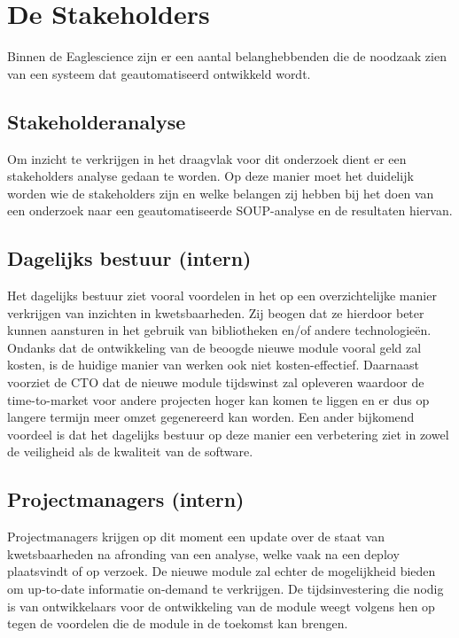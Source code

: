 \section{De Stakeholders}\label{sec:de-stakeholders}
Binnen de Eaglescience zijn er een aantal belanghebbenden die de noodzaak zien van een systeem dat geautomatiseerd ontwikkeld wordt.

\subsection{Stakeholderanalyse}\label{subsec:stakeholdersanalyse1}
Om inzicht te verkrijgen in het draagvlak voor dit onderzoek dient er een stakeholders analyse gedaan te worden. Op deze manier moet het duidelijk worden wie de stakeholders zijn en welke belangen zij hebben bij het doen van een onderzoek naar een geautomatiseerde SOUP-analyse en de resultaten hiervan.

\subsection{Dagelijks bestuur (intern)}\label{subsec:dagelijks-bestuur-(intern)1}
Het dagelijks bestuur ziet vooral voordelen in het op een overzichtelijke manier verkrijgen van inzichten in kwetsbaarheden. Zij beogen dat ze hierdoor beter kunnen aansturen in het gebruik van bibliotheken en/of andere technologieën. Ondanks dat de ontwikkeling van de beoogde nieuwe module vooral geld zal kosten, is de huidige manier van werken ook niet kosten-effectief. Daarnaast voorziet de CTO dat de nieuwe module tijdswinst zal opleveren waardoor de time-to-market voor andere projecten hoger kan komen te liggen en er dus op langere termijn meer omzet gegenereerd kan worden.
Een ander bijkomend voordeel is dat het dagelijks bestuur op deze manier een verbetering ziet in zowel de veiligheid als de kwaliteit van de software.

\subsection{Projectmanagers (intern)}\label{subsec:projectmanagers-(intern)1}
Projectmanagers krijgen op dit moment een update over de staat van kwetsbaarheden na afronding van een analyse, welke vaak na een deploy plaatsvindt of op verzoek. De nieuwe module zal echter de mogelijkheid bieden om up-to-date informatie on-demand te verkrijgen.
De tijdsinvestering die nodig is van ontwikkelaars voor de ontwikkeling van de module weegt volgens hen op tegen de voordelen die de module in de toekomst kan brengen.

